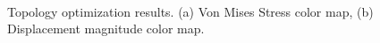                   \begin{figure}[hbt!]
\centering            
{}
      \\                                                      
                                  \caption{Topology optimization results. (a)  Von Mises Stress color map, (b) Displacement magnitude color map. \label{fig2.10b}} 
                                \end{figure}
                \clearpage
